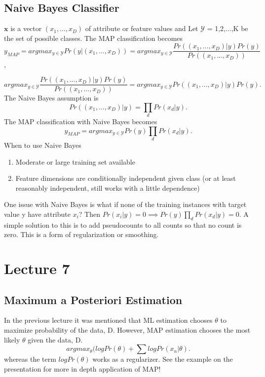 \documentclass[12pt]{article}
\numberwithin{equation}{section}
\begin{document}
\subsection{Naive Bayes Classifier}
$\bm{x}$ is a vector $(x_1, . . . , x_D)$ of attribute or feature values and Let $\mathcal{Y}$ = {1,2,...,K} be the set of possible classes. The MAP classification becomes
\begin{equation}
y_{MAP} = arg max_{y \in \mathcal{Y} } Pr(y | (x_1, . . . , x_D) ) = arg max_{y \in \mathcal{Y} } \frac{Pr((x_1, . . . , x_D) | y ) Pr( y )   }{Pr((x_1, . . . , x_D) ) } \end{equation},

\begin{equation}
arg max_{y \in \mathcal{Y} } \frac{Pr((x_1, . . . , x_D) | y ) Pr( y )   }{Pr((x_1, . . . , x_D) ) } =   arg max_{y \in \mathcal{Y} } Pr((x_1, . . . , x_D) | y ) Pr( y ).
\end{equation}
The Naive Bayes assumption is 
\begin{equation}
Pr((x_1, . . . , x_D) | y )  = \prod_d Pr(x_d | y).
\end{equation}
The MAP classification with Naive Bayes becomes
\begin{equation}
y_{MAP} = arg max_{y \in \mathcal{Y} } Pr(y )  \prod_d Pr(x_d | y).
\end{equation}
When to use Naive Bayes

\begin{enumerate}
\item Moderate or large training set available
\item Feature dimensions are conditionally independent given class (or at least reasonably independent, still works with a little dependence)
\end{enumerate}
One issue with Naive Bayes is what if none of the training instances with target value y have attribute $x_i$? Then $Pr(x_i|y ) = 0 \implies Pr(y )\prod_d Pr(x_d | y) = 0 $. A simple solution to this is to add pseudocounts to all counts so that no count is zero. This is a form of regularization or smoothing.

\section{Lecture 7}
\subsection{Maximum a Posteriori Estimation}
In the previous lecture it was mentioned that ML estimation chooses $\theta$ to maximize probability of the data, D. However, MAP estimation chooses the most likely $\theta$ given the data, D.
\begin{equation}
arg max_\theta (log Pr(\theta)+\sum log Pr(x_n |\theta). 
\end{equation}
whereas the term $log Pr(\theta)$ works as a regularizer. See the example on the presentation for more in depth application of MAP!
\end{document}
